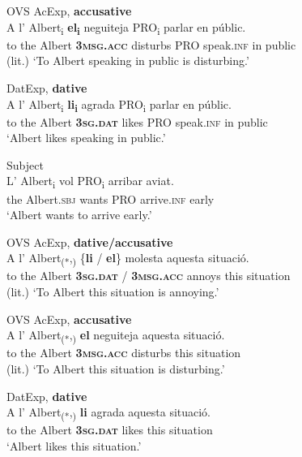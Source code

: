 \documentclass[output=paper,colorlinks,citecolor=brown,modfonts,nonflat]{langsci/langscibook}
\begin{document}
{{ \ex OVS AcExp, \textbf{accusative}\label{ex:royo:12b}\\
 \gll A l’ Albert\textsubscript{i} \textbf{el\textsubscript{i}} neguiteja PRO\textsubscript{i} parlar en públic.\\
  to the Albert \textbf{\textsc{3msg.acc}} disturbs PRO speak.\textsc{inf} in public\\
\glt (lit.) ‘To Albert speaking in public is disturbing.’
 
 \ex DatExp, \textbf{dative}\label{ex:royo:12c}\\
 \gll A l’ Albert\textsubscript{i} \textbf{li\textsubscript{i}} agrada PRO\textsubscript{i} parlar en públic.\\
 to the Albert \textbf{\textsc{3sg.dat}} likes PRO speak.\textsc{inf} in public\\
\glt ‘Albert likes speaking in public.’
 
 \ex Subject\label{ex:royo:12d}\\
 \gll L’ Albert\textsubscript{i} vol PRO\textsubscript{i} arribar aviat.\\
 the Albert.\textsc{sbj} wants PRO arrive.\textsc{inf} early\\
\glt ‘Albert wants to arrive early.’
 
 \z
 \z


 
\ea%
 \label{ex:royo:13}
 \ea OVS AcExp, \textbf{dative/accusative}\label{ex:royo:13a}\\
 \gll A l’ Albert\textsubscript{(*},\textsubscript{)} \{\textbf{li} / \textbf{el}\} molesta aquesta situació.\\
 to the Albert \textbf{\textsc{3sg.dat}} / \textbf{\textsc{3msg.acc}} annoys this situation\\
\glt (lit.) ‘To Albert this situation is annoying.’
 
 \ex OVS AcExp, \textbf{accusative}\label{ex:royo:13b}\\
 \gll A l’ Albert\textsubscript{(*},\textsubscript{)} \textbf{el} neguiteja aquesta situació.\\
 to the Albert \textbf{\textsc{3msg.acc}} disturbs this situation \\
\glt (lit.) ‘To Albert this situation is disturbing.’
 
 \ex DatExp, \textbf{dative}\label{ex:royo:13c}\\
 \gll A l’ Albert\textsubscript{(*},\textsubscript{)} \textbf{li} agrada aquesta situació.\\
 to the Albert \textbf{\textsc{3sg.dat}} likes this situation\\
\glt ‘Albert likes this situation.’
 
}}
\end{document}
